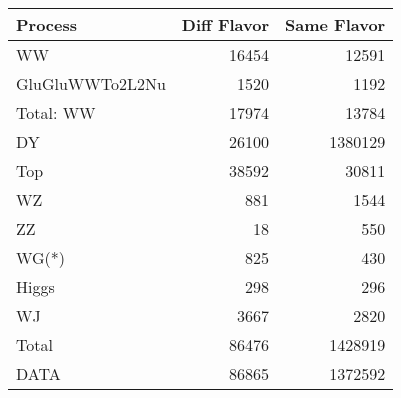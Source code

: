\begin{table}[ht]
	\centering
\begin{tabular}{lrr}

         Process &  Diff Flavor &  Same Flavor \\
		\hline
              WW &        16454 &        12591 \\
 GluGluWWTo2L2Nu &         1520 &         1192 \\
\hline
       Total: WW &        17974 &        13784 \\
              DY &        26100 &      1380129 \\
             Top &        38592 &        30811 \\
              WZ &          881 &         1544 \\
              ZZ &           18 &          550 \\
           WG(*) &          825 &          430 \\
           Higgs &          298 &          296 \\
              WJ &         3667 &         2820 \\
\hline
           Total &        86476 &      1428919 \\
            DATA &        86865 &      1372592 \\


\end{tabular}

\end{table}